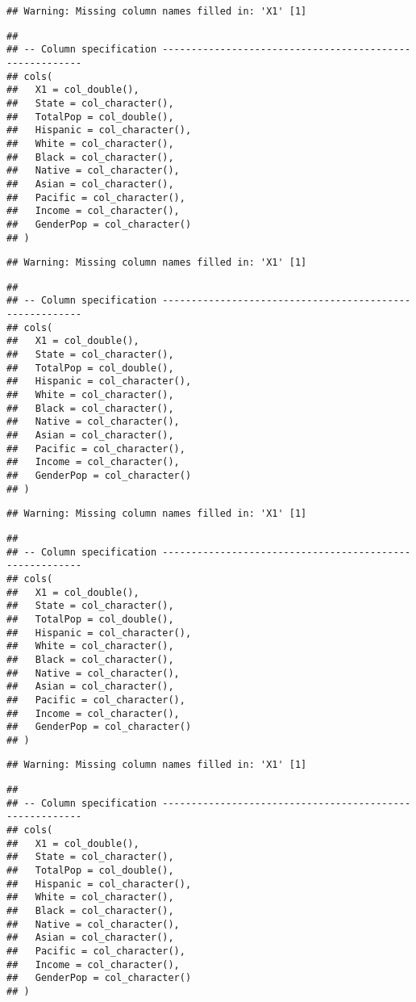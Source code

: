 \documentclass[
]{article}
\begin{document}
\begin{verbatim}
## Warning: Missing column names filled in: 'X1' [1]
\end{verbatim}

\begin{verbatim}
## 
## -- Column specification --------------------------------------------------------
## cols(
##   X1 = col_double(),
##   State = col_character(),
##   TotalPop = col_double(),
##   Hispanic = col_character(),
##   White = col_character(),
##   Black = col_character(),
##   Native = col_character(),
##   Asian = col_character(),
##   Pacific = col_character(),
##   Income = col_character(),
##   GenderPop = col_character()
## )
\end{verbatim}

\begin{verbatim}
## Warning: Missing column names filled in: 'X1' [1]
\end{verbatim}

\begin{verbatim}
## 
## -- Column specification --------------------------------------------------------
## cols(
##   X1 = col_double(),
##   State = col_character(),
##   TotalPop = col_double(),
##   Hispanic = col_character(),
##   White = col_character(),
##   Black = col_character(),
##   Native = col_character(),
##   Asian = col_character(),
##   Pacific = col_character(),
##   Income = col_character(),
##   GenderPop = col_character()
## )
\end{verbatim}

\begin{verbatim}
## Warning: Missing column names filled in: 'X1' [1]
\end{verbatim}

\begin{verbatim}
## 
## -- Column specification --------------------------------------------------------
## cols(
##   X1 = col_double(),
##   State = col_character(),
##   TotalPop = col_double(),
##   Hispanic = col_character(),
##   White = col_character(),
##   Black = col_character(),
##   Native = col_character(),
##   Asian = col_character(),
##   Pacific = col_character(),
##   Income = col_character(),
##   GenderPop = col_character()
## )
\end{verbatim}

\begin{verbatim}
## Warning: Missing column names filled in: 'X1' [1]
\end{verbatim}

\begin{verbatim}
## 
## -- Column specification --------------------------------------------------------
## cols(
##   X1 = col_double(),
##   State = col_character(),
##   TotalPop = col_double(),
##   Hispanic = col_character(),
##   White = col_character(),
##   Black = col_character(),
##   Native = col_character(),
##   Asian = col_character(),
##   Pacific = col_character(),
##   Income = col_character(),
##   GenderPop = col_character()
## )
\end{verbatim}
\end{document}
